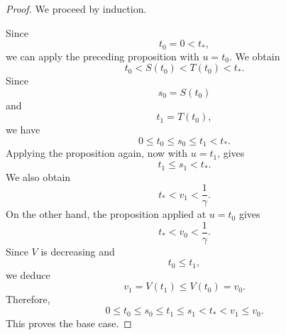 \documentclass[11pt,a4paper]{article}
\numberwithin{equation}{section}
\numberwithin{table}{section}
\theoremstyle{plain}
\theoremstyle{definition}\newtheorem{definition}[theorem]{Definition}
\theoremstyle{remark}\newtheorem{remark}[theorem]{Remark}
\begin{document}
\begin{proof}
We proceed by induction.

Since 
\begin{equation*}
t_0=0<t_*,
\end{equation*}
we can apply the preceding proposition with $u=t_0$. We obtain 
\begin{equation*}
t_0<S(t_0)<T(t_0)<t_*.
\end{equation*}
Since 
\begin{equation*}
s_0=S(t_0)
\end{equation*}
and 
\begin{equation*}
t_1=T(t_0),
\end{equation*}
we have 
\begin{equation*}
0\leq t_0\leq s_0\leq t_1<t_*.
\end{equation*}
Applying the proposition again, now with $u=t_1$, gives 
\begin{equation*}
t_1\leq s_1<t_*.
\end{equation*}
We also obtain 
\begin{equation*}
t_*<v_1<\frac1\gamma.
\end{equation*}
On the other hand, the proposition applied at $u=t_0$ gives 
\begin{equation*}
t_*<v_0<\frac1\gamma.
\end{equation*}
Since $V$ is decreasing and 
\begin{equation*}
t_0\leq t_1,
\end{equation*}
we deduce 
\begin{equation*}
v_1=V(t_1)\leq V(t_0)=v_0.
\end{equation*}
Therefore, 
\begin{equation*}
0\leq t_0\leq s_0\leq t_1\leq s_1<t_*<v_1\leq v_0.
\end{equation*}
This proves the base case.


\end{proof}
\end{document}
